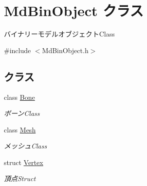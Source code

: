 \hypertarget{class_md_bin_object}{}\section{Md\+Bin\+Object クラス}
\label{class_md_bin_object}


バイナリーモデルオブジェクト\+Class  




{\ttfamily \#include $<$Md\+Bin\+Object.\+h$>$}

\subsection*{クラス}
\begin{DoxyCompactItemize}
\item 
class \mbox{\hyperlink{class_md_bin_object_1_1_bone}{Bone}}
\begin{DoxyCompactList}\small\item\em ボーン\+Class \end{DoxyCompactList}\item 
class \mbox{\hyperlink{class_md_bin_object_1_1_mesh}{Mesh}}
\begin{DoxyCompactList}\small\item\em メッシュ\+Class \end{DoxyCompactList}\item 
struct \mbox{\hyperlink{struct_md_bin_object_1_1_vertex}{Vertex}}
\begin{DoxyCompactList}\small\item\em 頂点\+Struct \end{DoxyCompactList}\end{DoxyCompactItemize}
